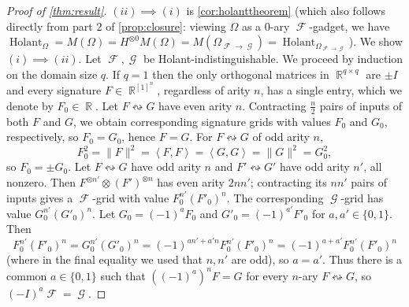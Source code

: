\documentclass{article}
\theoremstyle{remark}
\theoremstyle{definition}
\DeclareMathOperator{\rr}{\mathbb{R}}
\DeclareMathOperator{\fc}{\mathcal{F}}
\DeclareMathOperator{\gc}{\mathcal{G}}
\DeclareMathOperator{\holant}{Holant}
\begin{document}
\begin{proof}[Proof of \autoref{thm:result}]
    $(ii) \implies (i)$ is \autoref{cor:holanttheorem} (which also follows directly from part 2 of
    \autoref{prop:closure}: viewing $\Omega$ as a 0-ary $\fc$-gadget, we have 
    $\holant_{\Omega} = M(\Omega) = H^{\otimes 0} M(\Omega) = M(\Omega_{\fc\to\gc}) = 
    \holant_{\Omega_{\fc\to\gc}}$).
    We show $(i) \implies (ii)$. Let $\fc,\gc$
    be Holant-indistinguishable.
    We proceed by induction on the domain size $q$. If $q = 1$ then the only orthogonal matrices
    in $\rr^{q \times q}$ are $\pm I$ and every signature $F \in \rr^{[1]^n}$, regardless of arity $n$, 
    has a single entry, which we denote by $F_0 \in \rr$. Let $F \leftrightsquigarrow G$ have
    even arity $n$. Contracting $\frac{n}{2}$ pairs of inputs of both $F$ and $G$, 
    we obtain corresponding signature grids with values $F_0$ and $G_0$, respectively, so $F_0 = G_0$, hence
    $F = G$. For $F \leftrightsquigarrow G$ of odd arity $n$, 
    \[
        F_0^2 = \|F\|^2 = \left\langle F,F\right\rangle = \left\langle G,G\right\rangle = \|G\|^2 = G_0^2,
    \]
    so $F_0 = \pm G_0$. Let $F \leftrightsquigarrow G$ have odd arity $n$
    and $F' \leftrightsquigarrow G'$ have odd arity $n'$, all nonzero. Then
    $F^{\otimes n'} \otimes (F')^{\otimes n}$
    has even arity $2nn'$; contracting its $nn'$ pairs of inputs gives a $\fc$-grid
    with value $F_0^{n'}(F'_0)^n$. The corresponding $\gc$-grid has value
    $G_0^{n'}(G'_0)^n$. Let $G_0 = (-1)^aF_0$ and $G'_0 = (-1)^{a'} F'_0$ for $a,a'\in \{0,1\}$. Then
    \[
        F_0^{n'} (F'_0)^n = G_0^{n'}(G'_0)^n = (-1)^{an' + a'n}F_0^{n'}(F'_0)^n
        = (-1)^{a + a'}F_0^{n'}(F'_0)^n
    \]
    (where in the final equality we used that $n,n'$ are odd), so $a = a'$. Thus there is a common
    $a \in \{0,1\}$ such that $((-1)^a)^n F = G$ for every $n$-ary $F \leftrightsquigarrow G$,
    so $(-I)^a \fc = \gc$.


\end{proof}
\end{document}
